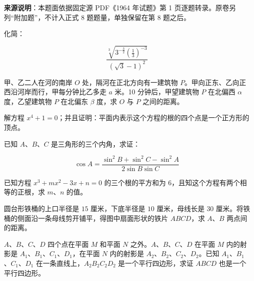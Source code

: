 

\begin{gktip}
\textbf{来源说明}：本题面依据固定源 PDF《1964 年试题》第 1 页逐题转录。原卷另列“附加题”，不计入正式 8 题题量，单独保留在第 8 题之后。
\end{gktip}

\par\medskip

\begin{question}
化简：

\nopagebreak[4]
\[\frac{\sqrt[3]{3^{-\frac32}\left(\frac13\right)^{-3}}}{(\sqrt3-1)^2}\]

\end{question}
\begin{question}
甲、乙二人在河的南岸 $O$ 处，隔河在正北方向有一建筑物 $P$。甲向正东、乙向正西沿河岸而行，甲每分钟比乙多走 $a$ 米。10 分钟后，甲望建筑物 $P$ 在北偏西 $\alpha$ 度，乙望建筑物 $P$ 在北偏东 $\beta$ 度，求 $O$ 与 $P$ 之间的距离。

\end{question}
\begin{question}
解方程 $x^4+1=0$；并且证明：平面内表示这个方程的根的四个点是一个正方形的顶点。

\end{question}
\begin{question}
已知 $A$、$B$、$C$ 是三角形的三个内角，求证：

\nopagebreak[4]
\[\cos A=\frac{\sin^2B+\sin^2C-\sin^2A}{2\sin B\sin C}\]

\end{question}
\begin{question}
已知方程 $x^3+mx^2-3x+n=0$ 的三个根的平方和为 $6$，且知这个方程有两个相等的正根，求 $m$、$n$ 的值。

\Needspace{0.4\textheight}
\end{question}
\begin{question}
圆台形铁桶的上口半径是 $15$ 厘米，下底半径是 $10$ 厘米，母线长是 $30$ 厘米。将铁桶的侧面沿一条母线剪开铺平，得图中扇面形状的铁片 $ABCD$，求 $A$、$B$ 两点间的距离。
\nopagebreak[4]
\begin{center}\end{center}
\nopagebreak[4]
\end{question}
\begin{question}
$A$、$B$、$C$、$D$ 四个点在平面 $M$ 和平面 $N$ 之外。$A$、$B$、$C$、$D$ 在平面 $M$ 内的射影是 $A_1$、$B_1$、$C_1$、$D_1$，在平面 $N$ 内的射影是 $A_2$、$B_2$、$C_2$、$D_2$。已知 $A_1$、$B_1$、$C_1$、$D_1$ 在一条直线上，$A_2B_2C_2D_2$ 是一个平行四边形，求证 $ABCD$ 也是一个平行四边形。

\Needspace{0.4\textheight}
\end{question}
